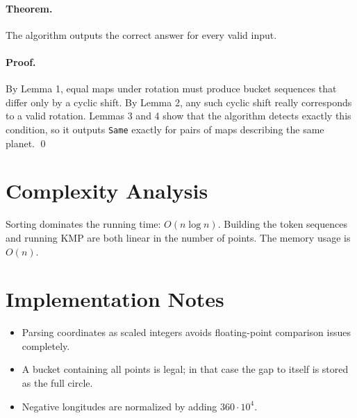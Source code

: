 \documentclass[11pt]{article}
\begin{document}
\paragraph{Theorem.}
The algorithm outputs the correct answer for every valid input.

\paragraph{Proof.}
By Lemma 1, equal maps under rotation must produce bucket sequences that differ only by a cyclic shift.
By Lemma 2, any such cyclic shift really corresponds to a valid rotation. Lemmas 3 and 4 show that the
algorithm detects exactly this condition, so it outputs \texttt{Same} exactly for pairs of maps describing the
same planet. \qed

\section*{Complexity Analysis}

Sorting dominates the running time: $O(n \log n)$.
Building the token sequences and running KMP are both linear in the number of points.
The memory usage is $O(n)$.

\section*{Implementation Notes}

\begin{itemize}[leftmargin=*]
    \item Parsing coordinates as scaled integers avoids floating-point comparison issues completely.
    \item A bucket containing all points is legal; in that case the gap to itself is stored as the full circle.
    \item Negative longitudes are normalized by adding $360 \cdot 10^4$.
\end{itemize}
\end{document}
